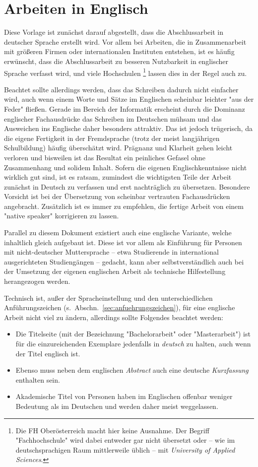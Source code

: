 \section{Arbeiten in Englisch}
\label{sec:englisch}

Diese Vorlage ist zunächst darauf abgestellt, dass die Abschlussarbeit in
deutscher Sprache erstellt wird. Vor allem bei Arbeiten, die in
Zusammenarbeit mit größeren Firmen oder internationalen Instituten entstehen,
ist es häufig erwünscht, dass die Abschlussarbeit zu besseren Nutzbarkeit in
englischer Sprache verfasst wird, und viele Hochschulen%
\footnote{Die FH Oberösterreich macht hier keine Ausnahme. Der Begriff
"Fachhochschule" wird dabei entweder gar nicht übersetzt oder -- wie im
deutschsprachigen Raum mittlerweile üblich -- mit \emph{University of Applied
Sciences}.}
lassen dies in der Regel auch zu.

Beachtet sollte allerdings werden, dass das Schreiben dadurch nicht einfacher
wird, auch wenn einem Worte und Sätze im Englischen scheinbar leichter "aus
der Feder" fließen. Gerade im Bereich der Informatik erscheint durch die
Dominanz englischer Fachausdrücke das Schreiben im Deutschen mühsam und das
Ausweichen ins Englische daher besonders attraktiv. Das ist jedoch
trügerisch, da die eigene Fertigkeit in der Fremdsprache (trotz der meist
langjährigen Schulbildung) häufig überschätzt wird. Prägnanz und Klarheit
gehen leicht verloren und bisweilen ist das Resultat ein peinliches Gefasel
ohne Zusammenhang und solidem Inhalt. Sofern die eigenen Englischkenntnisse
nicht wirklich gut sind, ist es ratsam, zumindest die wichtigsten Teile der
Arbeit zunächst in Deutsch zu verfassen und erst nachträglich zu übersetzen.
Besondere Vorsicht ist bei der Übersetzung von scheinbar vertrauten
Fachausdrücken angebracht. Zusätzlich ist es immer zu empfehlen, die fertige
Arbeit von einem "native speaker" korrigieren zu lassen.

Parallel zu diesem Dokument existiert auch eine englische Variante, welche
inhaltlich gleich aufgebaut ist. Diese ist vor allem als Einführung für
Personen mit nicht-deutscher Muttersprache -- etwa Studierende in
international ausgerichteten Studiengängen -- gedacht, kann aber
selbstverständlich auch bei der Umsetzung der eigenen englischen Arbeit als
technische Hilfestellung herangezogen werden.

Technisch ist, außer der Spracheinstellung und den unterschiedlichen
Anführungszeichen (s.\ Abschn.~\ref{sec:anfuehrungszeichen}), für eine
englische Arbeit nicht viel zu ändern, allerdings sollte Folgendes beachtet
werden:
%
\begin{itemize}
    \item Die Titelseite (mit der Bezeichnung "Bachelorarbeit" oder
    "Masterarbeit") ist für die einzureichenden Exemplare jedenfalls in
    \emph{deutsch} zu halten, auch wenn der Titel englisch ist.
    \item Ebenso muss neben dem englischen \emph{Abstract} auch eine deutsche
    \emph{Kurzfassung} enthalten sein. %
    \item Akademische Titel von Personen haben im Englischen offenbar
    weniger Bedeutung als im Deutschen und werden daher meist weggelassen.
\end{itemize}
